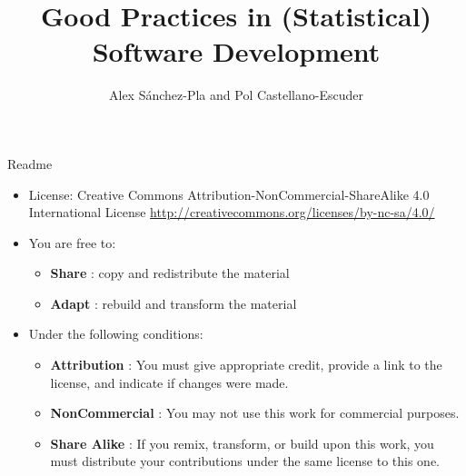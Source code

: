 \documentclass[ignorenonframetext,]{beamer}
\title{Good Practices in (Statistical)\\
Software Development}
\author{Alex Sánchez-Pla and Pol Castellano-Escuder}
\date{Genetics, Microbiology and Statistic Department. UB\\
Statistics and Bioinformatics Unit. VHIR\\
Grup de Recerca en Bioestadí­stica i Bioinformatica (GRBio)\\

\vspace{1cm}

Jan 26, 2019 - BIOSTATNET Meeting}
\providecommand{\tightlist}{%
  \setlength{\itemsep}{0pt}\setlength{\parskip}{0pt}}
\begin{document}
\frame{\titlepage}

\begin{frame}

\begin{block}{Readme}

\begin{itemize}
\item
  License: Creative Commons Attribution-NonCommercial-ShareAlike 4.0
  International License
  \url{http://creativecommons.org/licenses/by-nc-sa/4.0/}
\item
  You are free to:

  \begin{itemize}
  \tightlist
  \item
    \textbf{Share} : copy and redistribute the material
  \item
    \textbf{Adapt} : rebuild and transform the material
  \end{itemize}
\item
  Under the following conditions:

  \begin{itemize}
  \tightlist
  \item
    \textbf{Attribution} : You must give appropriate credit, provide a
    link to the license, and indicate if changes were made.
  \item
    \textbf{NonCommercial} : You may not use this work for commercial
    purposes.
  \item
    \textbf{Share Alike} : If you remix, transform, or build upon this
    work, you must distribute your contributions under the same license
    to this one.
  \end{itemize}
\end{itemize}

\end{block}

\end{frame}
\end{document}
